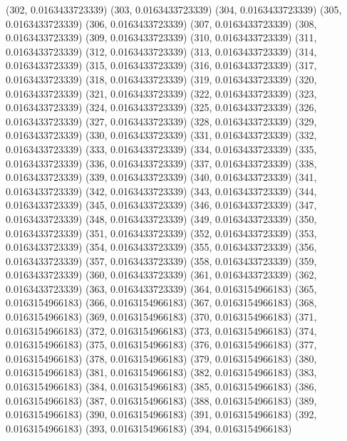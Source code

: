 {					(302, 0.0163433723339)
					(303, 0.0163433723339)
					(304, 0.0163433723339)
					(305, 0.0163433723339)
					(306, 0.0163433723339)
					(307, 0.0163433723339)
					(308, 0.0163433723339)
					(309, 0.0163433723339)
					(310, 0.0163433723339)
					(311, 0.0163433723339)
					(312, 0.0163433723339)
					(313, 0.0163433723339)
					(314, 0.0163433723339)
					(315, 0.0163433723339)
					(316, 0.0163433723339)
					(317, 0.0163433723339)
					(318, 0.0163433723339)
					(319, 0.0163433723339)
					(320, 0.0163433723339)
					(321, 0.0163433723339)
					(322, 0.0163433723339)
					(323, 0.0163433723339)
					(324, 0.0163433723339)
					(325, 0.0163433723339)
					(326, 0.0163433723339)
					(327, 0.0163433723339)
					(328, 0.0163433723339)
					(329, 0.0163433723339)
					(330, 0.0163433723339)
					(331, 0.0163433723339)
					(332, 0.0163433723339)
					(333, 0.0163433723339)
					(334, 0.0163433723339)
					(335, 0.0163433723339)
					(336, 0.0163433723339)
					(337, 0.0163433723339)
					(338, 0.0163433723339)
					(339, 0.0163433723339)
					(340, 0.0163433723339)
					(341, 0.0163433723339)
					(342, 0.0163433723339)
					(343, 0.0163433723339)
					(344, 0.0163433723339)
					(345, 0.0163433723339)
					(346, 0.0163433723339)
					(347, 0.0163433723339)
					(348, 0.0163433723339)
					(349, 0.0163433723339)
					(350, 0.0163433723339)
					(351, 0.0163433723339)
					(352, 0.0163433723339)
					(353, 0.0163433723339)
					(354, 0.0163433723339)
					(355, 0.0163433723339)
					(356, 0.0163433723339)
					(357, 0.0163433723339)
					(358, 0.0163433723339)
					(359, 0.0163433723339)
					(360, 0.0163433723339)
					(361, 0.0163433723339)
					(362, 0.0163433723339)
					(363, 0.0163433723339)
					(364, 0.0163154966183)
					(365, 0.0163154966183)
					(366, 0.0163154966183)
					(367, 0.0163154966183)
					(368, 0.0163154966183)
					(369, 0.0163154966183)
					(370, 0.0163154966183)
					(371, 0.0163154966183)
					(372, 0.0163154966183)
					(373, 0.0163154966183)
					(374, 0.0163154966183)
					(375, 0.0163154966183)
					(376, 0.0163154966183)
					(377, 0.0163154966183)
					(378, 0.0163154966183)
					(379, 0.0163154966183)
					(380, 0.0163154966183)
					(381, 0.0163154966183)
					(382, 0.0163154966183)
					(383, 0.0163154966183)
					(384, 0.0163154966183)
					(385, 0.0163154966183)
					(386, 0.0163154966183)
					(387, 0.0163154966183)
					(388, 0.0163154966183)
					(389, 0.0163154966183)
					(390, 0.0163154966183)
					(391, 0.0163154966183)
					(392, 0.0163154966183)
					(393, 0.0163154966183)
					(394, 0.0163154966183)
}
